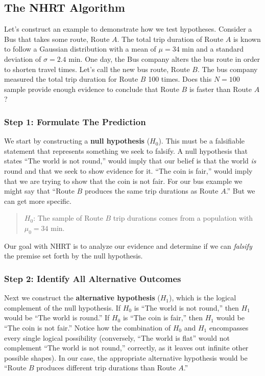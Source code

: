 \subsection*{The NHRT Algorithm}
Let's construct an example to demonstrate how we test hypotheses. Consider a Bus that takes some route, Route $A$. The total trip duration of Route $A$ is known to follow a Gaussian distribution with a mean of $\mu = 34 \text{ min}$ and a standard deviation of $\sigma=2.4 \text{ min}$. One day, the Bus company alters the bus route in order to shorten travel times. Let's call the new bus route, Route $B$. The bus company measured the total trip duration for Route $B$ 100 times. Does this $N=100$ sample provide enough evidence to conclude that Route $B$ is faster than Route $A$?

\subsubsection*{Step 1: Formulate The Prediction}
We start by constructing a \textbf{null hypothesis} ($H_0$). This must be a falsifiable statement that represents something we seek to falsify. A null hypothesis that states ``The world is not round,'' would imply that our belief is that the world \textit{is} round and that we seek to show evidence for it. ``The coin is fair,'' would imply that we are trying to show that the coin is not fair. For our bus example we might say that ``Route $B$ produces the same trip durations as Route $A$.'' But we can get more specific.

\begin{quote}
    $H_0$: The sample of Route $B$ trip durations comes from a population with $\mu_0 = 34 \text{ min}$.
\end{quote}

\noindent Our goal with NHRT is to analyze our evidence and determine if we can \textit{falsify} the premise set forth by the null hypothesis.

\subsubsection*{Step 2: Identify All Alternative Outcomes}
Next we construct the \textbf{alternative hypothesis} ($H_1$), which is the logical complement of the null hypothesis. If $H_0$ is ``The world is not round,'' then $H_1$ would be ``The world is round.'' If $H_0$ is ``The coin is fair,'' then $H_1$ would be ``The coin is not fair.'' Notice how the combination of $H_0$ and $H_1$ encompasses every single logical possibility (conversely, \eg{} ``The world is flat'' would not complement ``The world is not round,'' correctly, as it leaves out infinite other possible shapes). In our case, the appropriate alternative hypothesis would be ``Route $B$ produces different trip durations than Route $A$.''

